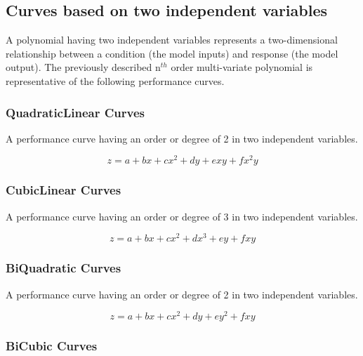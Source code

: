 \subsection{Curves based on two independent variables}\label{curves-based-on-two-independent-variables}

A polynomial having two independent variables represents a two-dimensional relationship between a condition (the model inputs) and response (the model output). The previously described n\(^{th}\) order multi-variate polynomial is representative of the following performance curves.

\subsubsection{QuadraticLinear Curves}\label{quadraticlinear-curves}

A performance curve having an order or degree of 2 in two independent variables.

\begin{equation}
z = a + bx + c{x^2} + dy + exy + f{x^2}y
\end{equation}

\subsubsection{CubicLinear Curves}\label{cubiclinear-curves}

A performance curve having an order or degree of 3 in two independent variables.

\begin{equation}
z = a + bx + c{x^2} + d{x^3} + ey + fxy
\end{equation}

\subsubsection{BiQuadratic Curves}\label{biquadratic-curves}

A performance curve having an order or degree of 2 in two independent variables.

\begin{equation}
z = a + bx + c{x^2} + dy + e{y^2} + fxy
\end{equation}

\subsubsection{BiCubic Curves}\label{bicubic-curves}

